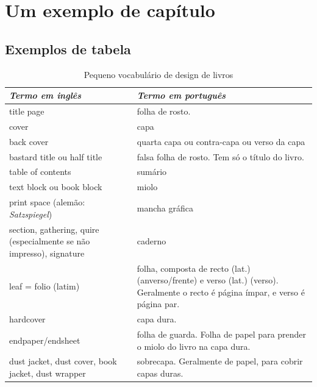 \documentclass[
	10pt,				%
	openright,			%
	twoside,			%
	a5paper,			%
	english,			%
	french,				%
	spanish,			%
	brazil,				%
]{abntex2}
\begin{document}
\chapter{Um exemplo de capítulo}

\section{Exemplos de tabela}



\begin{table}
\caption{Pequeno vocabulário de design de livros\label{vocabulario-texto}}
\footnotesize
\begin{tabular}{p{5cm}p{5cm}}
\toprule
\textit{Termo em inglês} & \textit{Termo em português}\\
\midrule
\footnotesize
title page & folha de rosto.\\

cover & capa\\

back cover & quarta capa ou contra-capa ou verso da capa\\

bastard title ou half title & falsa folha de rosto. Tem só o título do livro.\\

table of contents & sumário\\

text block ou book block & miolo\\

print space (alemão: \textit{Satzspiegel}) & mancha gráfica\\

section, gathering, quire (especialmente se não impresso), signature & caderno\\

leaf = folio (latim) & folha, composta de recto (lat.) (anverso/frente) e verso (lat.) (verso). Geralmente o recto é página ímpar, e verso é página par.\\

hardcover & capa dura.\\

endpaper/endsheet & folha de guarda. Folha de papel para prender o miolo do livro na capa dura.\\

dust jacket, dust cover, book jacket, dust wrapper & sobrecapa. Geralmente de papel, para cobrir capas duras.\\


\end{tabular}
\end{table}
\end{document}
